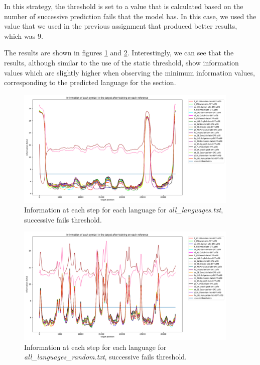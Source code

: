 \documentclass{article}
\begin{document}
In this strategy, the threshold is set to a value that is calculated based on the number of successive prediction fails that the model has.
In this case, we used the value that we used in the previous assignment that produced better results, which was $9$.

The results are shown in figures \ref{fig:all_languages_t_f} and \ref{fig:all_languages_random_t_f}.
Interestingly, we can see that the results, although similar to the use of the static threshold,
show information values which are slightly higher when observing the minimum information values, corresponding to the predicted language for the section. %

\begin{figure}
    \centering
    \includegraphics[width=0.95\textwidth]{../results/all_languages/-t_f:9.png}
    \caption{Information at each step for each language for \textit{all\_languages.txt}, successive fails threshold.}
    \label{fig:all_languages_t_f}
\end{figure}

\begin{figure}
    \centering
    \includegraphics[width=0.95\textwidth]{../results/all_languages_random/-t_f:9.png}
    \caption{Information at each step for each language for \textit{all\_languages\_random.txt}, successive fails threshold.}
    \label{fig:all_languages_random_t_f}
\end{figure}
\end{document}
